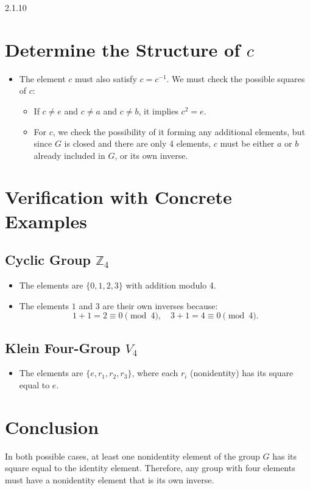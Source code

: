 \documentclass[12pt]{amsart}
\theoremstyle{definition}
\numberwithin{equation}{section}
\begin{document}
\begin{exercise}{2.1.10}
\section*{Determine the Structure of \(c\)}

\begin{itemize}
    \item The element \(c\) must also satisfy \(c = c^{-1}\). We must check the possible squares of \(c\):
    \begin{itemize}
        \item If \(c \neq e\) and \(c \neq a\) and \(c \neq b\), it implies \(c^2 = e\).
        \item For \(c\), we check the possibility of it forming any additional elements, but since \(G\) is closed and there are only 4 elements, \(c\) must be either \(a\) or \(b\) already included in \(G\), or its own inverse.
    \end{itemize}
\end{itemize}

\section*{Verification with Concrete Examples}

\subsection*{Cyclic Group \(\mathbb{Z}_4\)}

\begin{itemize}
    \item The elements are \(\{0, 1, 2, 3\}\) with addition modulo 4.
    \item The elements \(1\) and \(3\) are their own inverses because:
    \[
    1 + 1 = 2 \equiv 0 \pmod{4}, \quad 3 + 1 = 4 \equiv 0 \pmod{4}.
    \]
\end{itemize}

\subsection*{Klein Four-Group \(V_4\)}

\begin{itemize}
    \item The elements are \(\{e, r_1, r_2, r_3\}\), where each \(r_i\) (nonidentity) has its square equal to \(e\).
\end{itemize}

\section*{Conclusion}

In both possible cases, at least one nonidentity element of the group \(G\) has its square equal to the identity element. Therefore, any group with four elements must have a nonidentity element that is its own inverse.

\end{exercise}
\newpage

\end{document}

